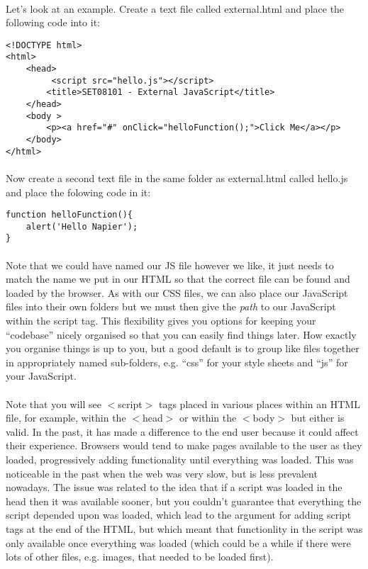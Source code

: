 \documentclass[10pt, a4paper]{article}
\begin{document}
\paragraph{} Let's look at an example. Create a text file called external.html and place the following code into it:

\begin{lstlisting}
<!DOCTYPE html>
<html>
    <head>
         <script src="hello.js"></script> 
        <title>SET08101 - External JavaScript</title>
    </head>
    <body >
        <p><a href="#" onClick="helloFunction();">Click Me</a></p>
    </body>
</html>
\end{lstlisting}

\paragraph{} Now create a second text file in the same folder as external.html called hello.js and place the folowing code in it:

\begin{lstlisting}
function helloFunction(){ 
    alert('Hello Napier'); 
}
\end{lstlisting}

\paragraph{} Note that we could have named our JS file however we like, it just needs to match the name we put in our HTML so that the correct file can be found and loaded by the browser. As with our CSS files, we can also place our JavaScript files into their own folders but we must then give the \emph{path} to our JavaScript within the script tag. This flexibility gives you options for keeping your ``codebase'' nicely organised so that you can easily find things later. How exactly you organise things is up to you, but a good default is to group like files together in appropriately named sub-folders, e.g. ``css'' for your style sheets and ``js'' for your JavaScript.

\paragraph{} Note that you will see $<$script$>$ tags placed in various places within an HTML file, for example, within the $<$head$>$ or within the $<$body$>$ but either is valid. In the past, it has made a difference to the end user because it could affect their experience. Browsers would tend to make pages available to the user as they loaded, progressively adding functionality until everything was loaded. This was noticeable in the past when the web was very slow, but is less prevalent nowadays. The issue was related to the idea that if a script was loaded in the head then it was available sooner, but you couldn't guarantee that everything the script depended upon was loaded, which lead to the argument for adding script tags at the end of the HTML, but which meant that functionlity in the script was only available once everything was loaded (which could be a while if there were lots of other files, e.g. images, that needed to be loaded first).
\end{document}
